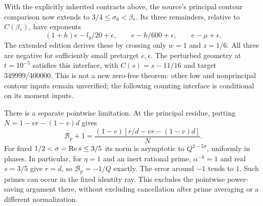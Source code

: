 With the explicitly inherited contracts above, the source's principal
contour comparison now extends to $3/4\le\sigma_0<\beta_*$. Its three
remainders, relative to $C(\beta_*)$, have exponents
\[
 (1+h)e-l_y/20+\epsilon,\qquad e-h/600+\epsilon,\qquad e-\mu+\epsilon.
\]
The extended edition derives these by crossing only $w=1$ and $z=1/6$.
All three are negative for sufficiently small pretarget $e,\epsilon$.
The perturbed geometry at $t=10^{-5}$ satisfies this interface, with
$C(s)=s-11/16$ and target $349999/400000$. This is not a new
zero-free theorem: other low and nonprincipal contour inputs
remain unverified; the following counting interface is conditional on its moment inputs.

There is a separate pointwise limitation. At the principal residue,
putting $N=1-vr-(1-v)d$ gives
\[
 \mathcal B_p+1=\frac{(1-v)[r/d-vr-(1-v)d]}{N}.
\]
For fixed $1/2<\sigma=\operatorname{Re} s\le3/5$ its norm is asymptotic to
$Q^{3-5\sigma}$, uniformly in phases. In particular, for $\eta=1$ and
an inert rational prime, $\alpha^{-6}=1$ and real $s=3/5$ give $r=d$,
so $\mathcal B_p=-1/Q$ exactly. The error around $-1$ tends to $1$.
Such primes can occur in the fixed identity ray. This excludes the
pointwise power-saving argument there, without excluding cancellation
after prime averaging or a different normalization.



